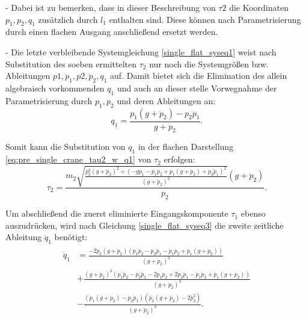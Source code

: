 - Dabei ist zu bemerken, dass in dieser Beschreibung von $\tau2$ die Koordinaten $p_1, p_2, q_1$ zusätzlich durch $l_1$ enthalten sind. Diese können nach Parametrisierung durch einen flachen Ausgang anschließend ersetzt werden. 

- Die letzte verbleibende Systemgleichung \ref{single_flat_syseq1} weist nach Substitution des soeben ermittelten $\tau_2$ nur noch die Systemgrößen bzw. Ableitungen $p1, \ddot{p}_1, p2, \ddot{p}_2, q_1$ auf. Damit bietet sich die Elimination des allein algebraisch vorkommenden $q_1$ und auch an dieser stelle Vorwegnahme der Parametrisierung durch $p_1, p_2$ und deren Ableitungen an: 
\begin{equation}
	q_1 = \frac{p_{1} \left(g + \ddot{p}_{2}\right) - p_{2} \ddot{p}_{1}}{g + \ddot{p}_{2}}.
\end{equation}

Somit kann die Substitution von $q_1$ in der flachen Darstellung \ref{eq:pre_single_crane_tau2_w_q1} von $\tau_2$ erfolgen:
\begin{equation}
	\tau_2 =
	\frac{m_{2} \sqrt{\frac{p_{2}^{2} \left(g + \ddot{p}_{2}\right)^{2} + \left(- g p_{1} - p_{1} \ddot{p}_{2} + p_{1} \left(g + \ddot{p}_{2}\right) + p_{2} \ddot{p}_{1}\right)^{2}}{\left(g + \ddot{p}_{2}\right)^{2}}} \left(g + \ddot{p}_{2}\right)}{p_{2}}.
\end{equation}

Um abschließend die zuerst eliminierte Eingangskomponente $\tau_1$ ebenso auszudrücken, wird nach Gleichung \ref{single_flat_syseq3} die zweite zeitliche Ableitung $\ddot{q}_1$ benötigt:
\begin{align}
	\begin{split}
	\ddot{q}_1 &=
	\frac{-2 \dddot{p}_{2} \left(g + \ddot{p}_{2}\right) \left(p_{1} \dddot{p}_{2} - p_{2} \dddot{p}_{1} - \ddot{p}_{1} \dot{p}_{2} + \dot{p}_{1} \left(g + \ddot{p}_{2}\right)\right) }{\left(g + \ddot{p}_{2}\right)^{3}} \\	
	&+ \frac{\left(g + \ddot{p}_{2}\right)^{2} \left(p_{1} \ddddot{p}_{2} - p_{2} \ddddot{p}_{1} - 2 \dddot{p}_{1} \dot{p}_{2} + 2 \dddot{p}_{2} \dot{p}_{1} - \ddot{p}_{1} \ddot{p}_{2} + \ddot{p}_{1} \left(g + \ddot{p}_{2}\right)\right)}{\left(g + \ddot{p}_{2}\right)^{3}}\\	
	&- \frac{\left(p_{1} \left(g + \ddot{p}_{2}\right) - p_{2} \ddot{p}_{1}\right) \left(\ddddot{p}_{2} \left(g + \ddot{p}_{2}\right) - 2 \dddot{p}_{2}^{2}\right)}{\left(g + \ddot{p}_{2}\right)^{3}}.
	\end{split}
\end{align}

